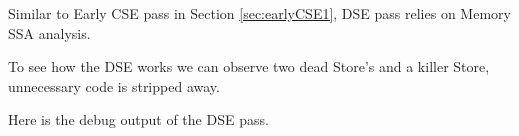 Similar to Early CSE pass in Section \ref{sec:earlyCSE1}, DSE pass relies on Memory SSA analysis.





To see how the DSE works we can observe two dead Store's and a killer Store, unnecessary code is stripped away.



Here is the debug output of the DSE pass.

